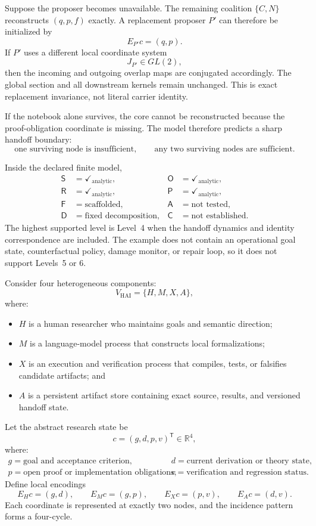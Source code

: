 Suppose the proposer becomes unavailable. The remaining coalition \(\{C,N\}\)
reconstructs \((q,p,f)\) exactly. A replacement proposer \(P'\) can therefore
be initialized by
\[
E_{P'}c=(q,p).
\]
If \(P'\) uses a different local coordinate system
\[
J_{P'}\in GL(2),
\]
then the incoming and outgoing overlap maps are conjugated accordingly. The
global section and all downstream kernels remain unchanged. This is exact
replacement invariance, not literal carrier identity.

If the notebook alone survives, the core cannot be reconstructed because the
proof-obligation coordinate is missing. The model therefore predicts a sharp
handoff boundary:
\[
\text{one surviving node is insufficient},
\qquad
\text{any two surviving nodes are sufficient}.
\]


Inside the declared finite model,
\[
\boxed{
\begin{aligned}
\mathsf S&=\checkmark_{\mathrm{analytic}},
&\mathsf O&=\checkmark_{\mathrm{analytic}},\\
\mathsf R&=\checkmark_{\mathrm{analytic}},
&\mathsf P&=\checkmark_{\mathrm{analytic}},\\
\mathsf F&=\text{scaffolded},
&\mathsf A&=\text{not tested},\\
\mathsf D&=\text{fixed decomposition},
&\mathsf C&=\text{not established}.
\end{aligned}
}
\]
The highest supported level is Level~4 when the handoff dynamics and identity
correspondence are included. The example does not contain an operational goal
state, counterfactual policy, damage monitor, or repair loop, so it does not
support Levels~5 or 6.



Consider four heterogeneous components:
\[
V_{\mathrm{HAI}}=\{H,M,X,A\},
\]
where:
\begin{itemize}
\item \(H\) is a human researcher who maintains goals and semantic direction;
\item \(M\) is a language-model process that constructs local formalizations;
\item \(X\) is an execution and verification process that compiles, tests, or
 falsifies candidate artifacts; and
\item \(A\) is a persistent artifact store containing exact source, results,
 and versioned handoff state.
\end{itemize}
Let the abstract research state be
\[
c=(g,d,p,v)^{\mathsf T}\in\mathbb R^4,
\]
where:
\[
\begin{array}{ll}
g=\text{goal and acceptance criterion},
&d=\text{current derivation or theory state},\\
p=\text{open proof or implementation obligations},
&v=\text{verification and regression status}.
\end{array}
\]
Define local encodings
\[
E_Hc=(g,d),
\qquad
E_Mc=(g,p),
\qquad
E_Xc=(p,v),
\qquad
E_Ac=(d,v).
\]
Each coordinate is represented at exactly two nodes, and the incidence pattern
forms a four-cycle.

